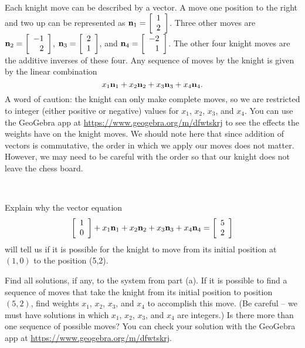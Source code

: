 Each knight move can be described by a vector. A move one position to the right and two up can be represented as $\mathbf{n}_1 = \left[ \begin{array}{c} 1\\2 \end{array} \right]$. Three other moves are $\mathbf{n}_2 = \left[ \begin{array}{r} -1\\2 \end{array} \right]$, $\mathbf{n}_3 = \left[ \begin{array}{c} 2\\1 \end{array} \right]$, and $\mathbf{n}_4 = \left[ \begin{array}{r} -2\\1 \end{array} \right]$. The other four knight moves are the additive inverses of these four. Any sequence of moves by the knight is given by the linear combination
\[x_1 \mathbf{n}_1 + x_2 \mathbf{n}_2 + x_3 \mathbf{n}_3 + x_4 \mathbf{n}_4.\]
A word of caution: the knight can only make complete moves, so we are restricted to integer (either positive or negative) values for $x_1$, $x_2$, $x_3$, and $x_4$. You can use the GeoGebra app at \url{https://www.geogebra.org/m/dfwtskrj} to see the effects the weights have on the knight moves.  We should note here that since addition of vectors is commutative, the order in which we apply our moves does not matter. However, we may need to be careful with the order so that our knight does not leave the chess board. 

\begin{pactivity} \label{act:knight_1} ~
\ba
\item Explain why the vector equation 
\[\left[ \begin{array}{c} 1\\0 \end{array} \right] + x_1 \mathbf{n}_1 + x_2 \mathbf{n}_2 + x_3 \mathbf{n}_3 + x_4 \mathbf{n}_4 = \left[ \begin{array}{c} 5\\2 \end{array} \right]\]
will tell us if it is possible for the knight to move from its initial position at $(1,0)$ to the position (5,2). 

	\item Find all solutions, if any, to the system from part (a). If it is possible to find a sequence of moves that take the knight from its initial position to position $(5,2)$, find weights $x_1$, $x_2$, $x_3$, and $x_4$ to accomplish this move. (Be careful -- we must have solutions in which $x_1$, $x_2$, $x_3$, and $x_4$ are integers.) Is there more than one sequence of possible moves? You can check your solution with the GeoGebra app at \url{https://www.geogebra.org/m/dfwtskrj}.

	\ea
	
\end{pactivity}

